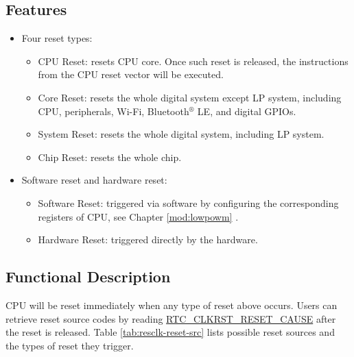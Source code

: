 \documentclass[main\_\_EN.tex]{subfiles}
\begin{document}
\subsection{Features}
\label{sec:resclk-features}
\begin{itemize}
    \item Four reset types:
    \begin{itemize}
    \item CPU Reset: resets CPU core. Once such reset is released, the instructions from the CPU reset vector will be executed.
    \item Core Reset: resets the whole digital system except LP system, including CPU, peripherals, Wi-Fi, Bluetooth$^®$ LE, and digital GPIOs.
    \item System Reset: resets the whole digital system, including LP system.
    \item Chip Reset: resets the whole chip.
    \end{itemize}
    \item Software reset and hardware reset:
    \begin{itemize}
        \item Software Reset: triggered via software by configuring the corresponding registers of CPU, see Chapter  \ref{mod:lowpowm} \textit{}.
        \item Hardware Reset: triggered directly by the hardware.
    \end{itemize}
\end{itemize}

\subsection{Functional Description}
CPU will be reset immediately when any type of reset above occurs. Users can retrieve reset source codes by reading  \hyperref[fielddesc:RTCCLKRSTRESETCAUSE]{RTC\_CLKRST\_RESET\_CAUSE} after the reset is released.
Table \ref{tab:resclk-reset-src} lists possible reset sources and the types of reset they trigger.
\end{document}

